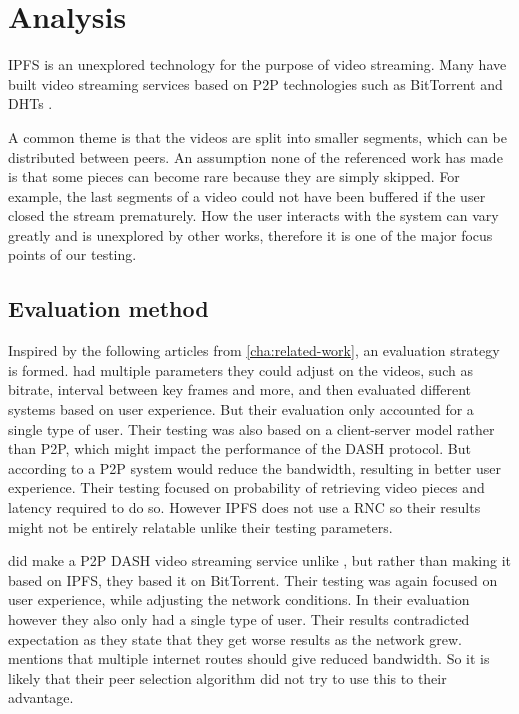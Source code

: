 \chapter{Analysis}
\label{cha:analysis}

\ac{IPFS} is an unexplored technology for the purpose of video streaming. Many have built video streaming services based on \ac{P2P} technologies such as BitTorrent and \ac{DHT}s \cite{gazdar2017toward}.

A common theme is that the videos are split into smaller segments, which can be distributed between peers. An assumption none of the referenced work has made is that some pieces can become rare because they are simply skipped. For example, the last segments of a video could not have been buffered if the user closed the stream prematurely. How the user interacts with the system can vary greatly and is unexplored by other works, therefore it is one of the major focus points of our testing.

\section{Evaluation method}
Inspired by the following articles from \autoref{cha:related-work}, an evaluation strategy is formed.
\citeauthor{aloman2015performance} \cite{aloman2015performance} had multiple parameters they could adjust on the videos, such as bitrate, interval between key frames and more, and then evaluated different systems based on user experience. But their evaluation only accounted for a single type of user. Their testing was also based on a client-server model rather than \ac{P2P}, which might impact the performance of the \ac{DASH} protocol. But according to \citeauthor{nguyen2009p2p} a \ac{P2P} system would reduce the bandwidth, resulting in better user experience. Their testing focused on probability of retrieving video pieces and latency required to do so. However \ac{IPFS} does not use a \ac{RNC} so their results might not be entirely relatable unlike their testing parameters.

\citeauthor{gazdar2017toward} \cite{gazdar2017toward} did make a \ac{P2P} \ac{DASH} video streaming service unlike \citeauthor{aloman2015performance}, but rather than making it based on \ac{IPFS}, they based it on BitTorrent. Their testing was again focused on user experience, while adjusting the network conditions. In their evaluation however they also only had a single type of user. Their results contradicted expectation as they state that they get worse results as the  network grew. \citeauthor{nguyen2009p2p} mentions that multiple internet routes should give reduced bandwidth. So it is likely that their peer selection algorithm did not try to use this to their advantage.

